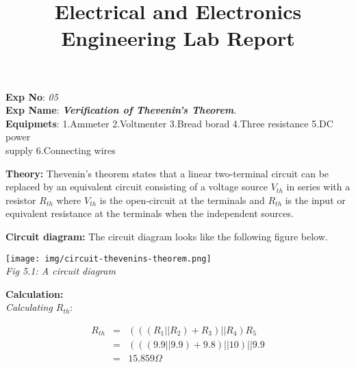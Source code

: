 \documentclass[12pt, a4paper]{article}
\title{Electrical and Electronics Engineering Lab Report}
\begin{document}
\date{}
\maketitle

\begin{flushleft}
	\textbf{Exp No}: \textit{05}\\
	\textbf{Exp Name}: \textit{\textbf {Verification of Thevenin's Theorem}}.\\ 

	\textbf{Equipmets}: 1.Ammeter 2.Voltmenter 3.Bread borad 4.Three resistance 5.DC power\\ 
	\qquad \qquad \qquad supply 6.Connecting wires
\end{flushleft}

\begin{flushleft}
	\textbf{Theory:} Thevenin's theorem states that a linear two-terminal circuit can be replaced by an equivalent circuit consisting of a voltage source $V_{th}$ in series with a resistor $R_{th}$ where $V_{th}$ is the open-circuit at the terminals and $R_{th}$ is the input or equivalent resistance at the terminals when the independent sources.
\end{flushleft}

\begin{flushleft}
	\textbf{Circuit diagram:} The circuit diagram looks like the following figure below.
	\begin{center}
		\texttt{[image: img/circuit-thevenins-theorem.png]}\\
		\textit{Fig 5.1: A circuit diagram}
	\end{center}
\end{flushleft}

\begin{flushleft}
	\textbf{Calculation:} \\
	\qquad \textit{Calculating $R_{th}$}:
\end{flushleft}
\begin{eqnarray*}
	R_{th} &=& (((R_1 || R_2) + R_3) || R_4) R_5 \\
		   &=& (((9.9 || 9.9) + 9.8) || 10) || 9.9 \\
		   &=& 15.859 \Omega \\
\end{eqnarray*}
\end{document}

